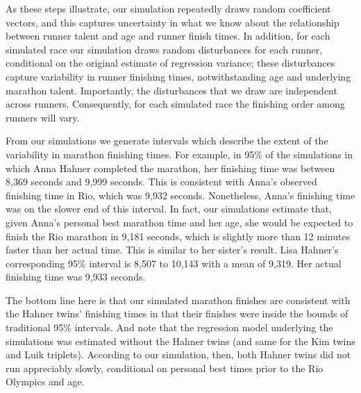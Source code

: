 \documentclass[12pt,titlepage]{article}
\begin{document}
As these steps illustrate, our simulation repeatedly draws random
coefficient vectors, and this captures uncertainty in what we know
about the relationship between runner talent and age and runner finish
times.  In addition, for each simulated race our simulation draws
random disturbances for each runner, conditional on the original
estimate of regression variance; these disturbances capture
variability in runner finishing times, notwithstanding age and
underlying marathon talent.  Importantly, the disturbances that we
draw are independent across runners.  Consequently, for each simulated
race the finishing order among runners will vary.

From our simulations we generate intervals which describe the extent
of the variability in marathon finishing times. For example, in 95\%
of the simulations in which Anna Hahner completed the marathon, her
finishing time was between 8,369 seconds and 9,999 seconds. This is
consistent with Anna's observed finishing time in Rio, which was 9,932
seconds. Nonetheless, Anna's finishing time was on the slower end of
this interval.  In fact, our simulations estimate that, given Anna's
personal best marathon time and her age, she would be expected to
finish the Rio marathon in 9,181 seconds, which is slightly more than
12 minutes faster than her actual time.  This is similar to her
sister's result. Lisa Hahner's corresponding 95\% interval is 8,507 to
10,143 with a mean of 9,319.  Her actual finishing time was 9,933
seconds.

The bottom line here is that our simulated marathon finishes are
consistent with the Hahner twins' finishing times in that their
finishes were inside the bounds of traditional 95\% intervals. And
note that the regression model underlying the simulations was
estimated without the Hahner twins (and same for the Kim twins and
Luik triplets). According to our simulation, then, both Hahner twins
did not run appreciably slowly, conditional on personal best times
prior to the Rio Olympics and age.




\end{document}
